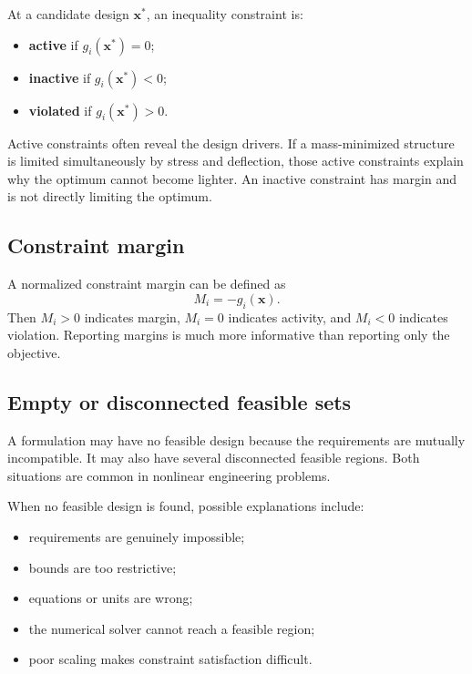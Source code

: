 \documentclass[11pt]{article}
\newcommand{\vect}[1]{\boldsymbol{#1}}
\newcommand{\des}{\vect{x}}
\begin{document}
At a candidate design $\des^*$, an inequality constraint is:
\begin{itemize}[leftmargin=1.4em]
  \item \textbf{active} if $g_i(\des^*)=0$;
  \item \textbf{inactive} if $g_i(\des^*)<0$;
  \item \textbf{violated} if $g_i(\des^*)>0$.
\end{itemize}

Active constraints often reveal the design drivers. If a mass-minimized structure is limited simultaneously by stress and deflection, those active constraints explain why the optimum cannot become lighter. An inactive constraint has margin and is not directly limiting the optimum.

\subsection{Constraint margin}

A normalized constraint margin can be defined as
\begin{equation}
M_i = -g_i(\des).
\end{equation}
Then $M_i>0$ indicates margin, $M_i=0$ indicates activity, and $M_i<0$ indicates violation. Reporting margins is much more informative than reporting only the objective.

\subsection{Empty or disconnected feasible sets}

A formulation may have no feasible design because the requirements are mutually incompatible. It may also have several disconnected feasible regions. Both situations are common in nonlinear engineering problems.

When no feasible design is found, possible explanations include:
\begin{itemize}[leftmargin=1.4em]
  \item requirements are genuinely impossible;
  \item bounds are too restrictive;
  \item equations or units are wrong;
  \item the numerical solver cannot reach a feasible region;
  \item poor scaling makes constraint satisfaction difficult.
\end{itemize}
\end{document}
